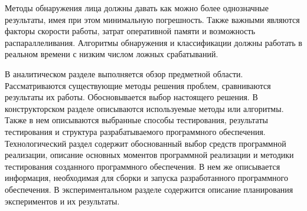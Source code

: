 Методы обнаружения лица должны давать как можно более однозначные результаты, имея при этом
минимальную погрешность. Также важными являются факторы скорости работы,
затрат оперативной памяти и возможность распараллеливания. Алгоритмы обнаружения и
классификации должны работать в реальном времени с низким числом ложных срабатываний.

В аналитическом разделе выполняется обзор предметной области. Рассматриваются существующие методы решения проблем, сравниваются
результаты их работы. Обосновывается выбор настоящего решения. В конструкторском разделе описываются используемые методы или алгоритмы.
Также в нем описываются выбранные способы тестирования, результаты тестирования и структура разрабатываемого программного обеспечения.
Технологический раздел содержит обоснованный выбор средств программной
реализации, описание основных моментов программной реализации и методики
тестирования созданного программного обеспечения. В нем же описывается информация,
необходимая для сборки и запуска разработанного программного обеспечения. В экспериментальном разделе содержится описание
планирования экспериментов и их результаты.

\clearpage
